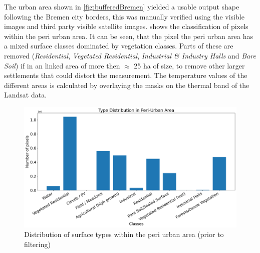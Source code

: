 \documentclass[12pt,a4paper, english,twoside]{scrartcl}
\begin{document}
      The urban area shown in \cref{fig:bufferedBremen} yielded a usable output shape following the Bremen city borders, this was manually verified using the visible images and third party visible satellite images. 
       shows the classification of pixels within the peri urban area.
      It can be seen, that the pixel the peri urban area has a mixed surface classes dominated by vegetation classes. 
      Parts of these are removed (\textit{Residential}, \textit{Vegetated Residential}, \textit{Industrial \& Industry Halls} and \textit{Bare Soil}) if in an linked area of more then $\approx$ 25 ha of size, to remove other larger settlements that could distort the measurement.
      The temperature values of the different areas is calculated by overlaying the masks on the thermal band of the Landsat data. 
%
        \begin{figure}[!htbp]
         \centering
         \includegraphics[width=\textwidth]{img/ClassDistributionPU2019-06-29.png}
         \caption{Distribution of surface types within the peri urban area (prior to filtering)}\label{fig:classesPeri}
        \end{figure}
\end{document}
